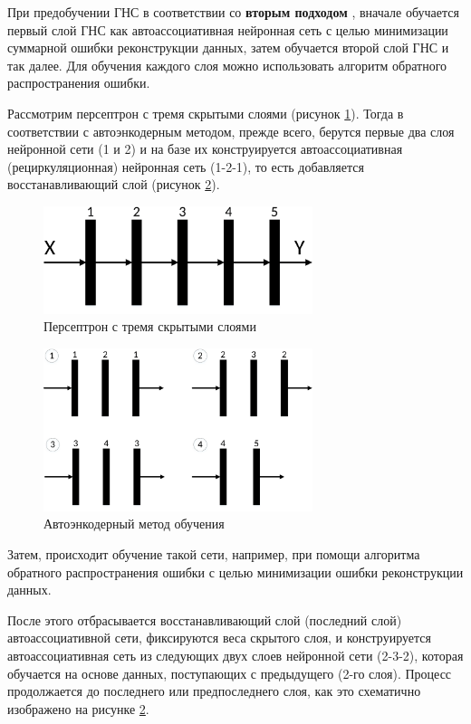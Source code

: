 При предобучении ГНС в соответствии со \textbf{вторым подходом} \cite{n6}, вначале обучается первый слой ГНС как автоассоциативная нейронная сеть с целью минимизации суммарной ошибки реконструкции данных, затем обучается второй слой ГНС и так далее. Для обучения каждого слоя можно использовать алгоритм обратного распространения ошибки. 
	
Рассмотрим персептрон с тремя скрытыми слоями (рисунок \ref{fig:pic1_5}). Тогда в соответствии с автоэнкодерным методом, прежде всего, берутся первые два слоя нейронной сети (1 и 2) и на базе их конструируется автоассоциативная (рециркуляционная) нейронная сеть (1-2-1), то есть добавляется восстанавливающий слой (рисунок \ref{fig:pic1_6}). 
	
\begin{figure}[H]
  \centering
  \includegraphics[width=0.7\textwidth]{man-source/images/ch1/pic1-5.pdf}
  \caption{Персептрон с тремя скрытыми слоями}
  \label{fig:pic1_5}
\end{figure}	

\begin{figure}[H]
  \centering
  \includegraphics[width=0.7\textwidth]{man-source/images/ch1/pic1-6.pdf}
  \caption{Автоэнкодерный метод обучения}
  \label{fig:pic1_6}
\end{figure}

Затем, происходит обучение такой сети, например, при помощи алгоритма обратного распространения ошибки с целью минимизации ошибки реконструкции данных. 
	
После этого отбрасывается восстанавливающий слой (последний слой) автоассоциативной сети, фиксируются веса скрытого слоя, и конструируется автоассоциативная сеть из следующих двух слоев нейронной сети (2-3-2), которая обучается на основе данных, поступающих с предыдущего (2-го слоя). Процесс продолжается до последнего или предпоследнего слоя, как это схематично изображено на рисунке \ref{fig:pic1_6}. %
	
